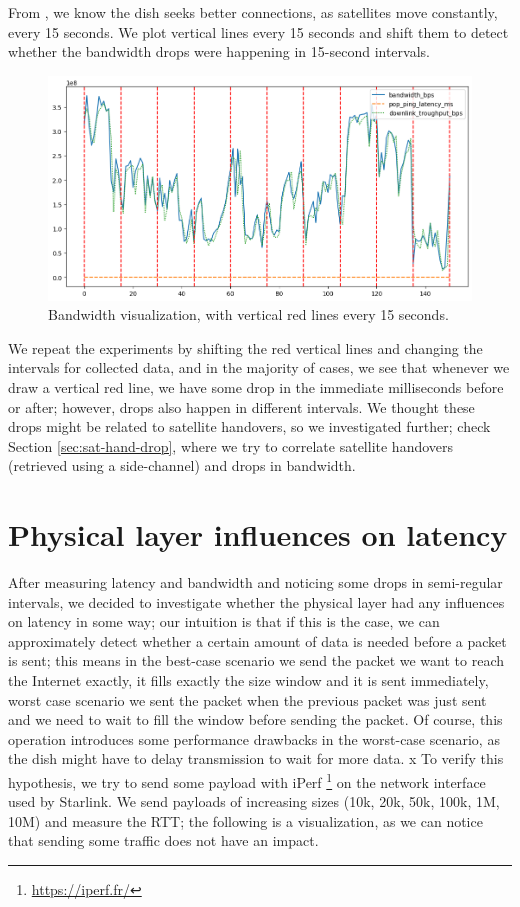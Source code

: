 \documentclass[IN,11pt,twoside,openright,idp,english]{tumthesis}
\begin{document}
From \cite{llc-application}, we know the dish seeks better connections, as satellites move constantly, every 15 seconds. We plot vertical lines every 15 seconds and shift them to detect whether the bandwidth drops were happening in 15-second intervals.

\begin{figure}
    \centering
    \includegraphics[width=1.0\columnwidth]{img/bw-15seconds.png}
    \caption{Bandwidth visualization, with vertical red lines every 15 seconds.}
    \label{fig:vis-bw-15sec}
\end{figure}

We repeat the experiments by shifting the red vertical lines and changing the intervals for collected data, and in the majority of cases, we see that whenever we draw a vertical red line, we have some drop in the immediate milliseconds before or after; however, drops also happen in different intervals. We thought these drops might be related to satellite handovers, so we investigated further; check Section \ref{sec:sat-hand-drop}, where we try to correlate satellite handovers (retrieved using a side-channel) and drops in bandwidth. 

\section{Physical layer influences on latency}

After measuring latency and bandwidth and noticing some drops in semi-regular intervals, we decided to investigate whether the physical layer had any influences on latency in some way; our intuition is that if this is the case, we can approximately detect whether a certain amount of data is needed before a packet is sent; this means in the best-case scenario we send the packet we want to reach the Internet exactly, it fills exactly the size window and it is sent immediately, worst case scenario we sent the packet when the previous packet was just sent and we need to wait to fill the window before sending the packet. Of course, this operation introduces some performance drawbacks in the worst-case scenario, as the dish might have to delay transmission to wait for more data.
x
To verify this hypothesis, we try to send some payload with iPerf \footnote{\url{https://iperf.fr/}} on the network interface used by Starlink. We send payloads of increasing sizes (10k, 20k, 50k, 100k, 1M, 10M) and measure the RTT; the following is a visualization, as we can notice that sending some traffic does not have an impact.
\end{document}

